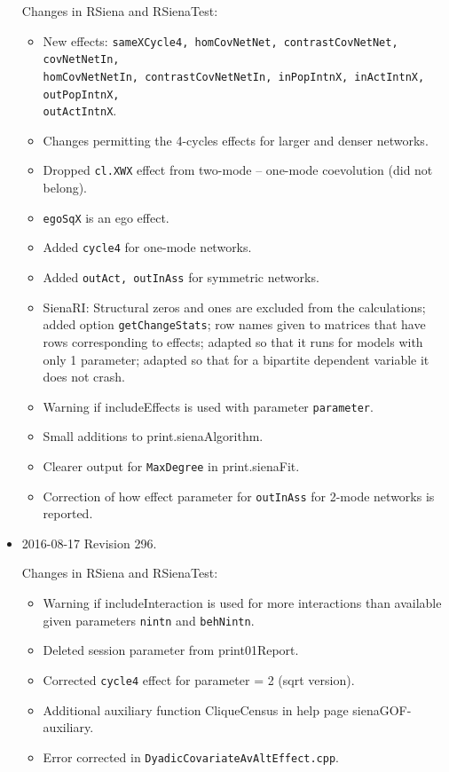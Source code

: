 \documentclass[a4paper,fleqn,11pt]{article}
\newcommand{\+}{\, + \,}
\newcommand{\sfn}[1]{\textsf{#1}}
\begin{document}
\begin{small}
\begin{itemize}
Changes in \textsf{RSiena} and \textsf{RSienaTest}:
\begin{itemize}
   \item New effects: \texttt{sameXCycle4, homCovNetNet, contrastCovNetNet,
     covNetNetIn, \\
     homCovNetNetIn, contrastCovNetNetIn, inPopIntnX, inActIntnX, outPopIntnX, \\
     outActIntnX}.
   \item Changes permitting the 4-cycles effects for larger and denser networks.
   \item Dropped \texttt{cl.XWX} effect from two-mode -- one-mode coevolution
     (did not belong).
   \item \texttt{egoSqX} is an ego effect.
   \item Added \texttt{cycle4} for one-mode networks.
   \item Added \texttt{outAct, outInAss} for symmetric networks.
   \item \sfn{SienaRI}: Structural zeros and ones are excluded from the calculations;
     added option \texttt{getChangeStats};
     row names given to matrices that have rows corresponding to effects;
     adapted so that it runs for models with only 1 parameter;
     adapted so that for a bipartite dependent variable it does not crash.
   \item Warning if \sfn{includeEffects} is used with parameter \texttt{parameter}.
   \item Small additions to \sfn{print.sienaAlgorithm}.
   \item Clearer output for \texttt{MaxDegree} in \sfn{print.sienaFit}.
   \item Correction of how effect parameter for \texttt{outInAss}
     for 2-mode networks is reported.
\end{itemize}


\item 2016-08-17 Revision 296.

Changes in \textsf{RSiena} and \textsf{RSienaTest}:
\begin{itemize}
   \item Warning if \sfn{includeInteraction} is used for more interactions
     than available given parameters \texttt{nintn} and \texttt{behNintn}.
   \item Deleted session parameter from \textsf{print01Report}.
   \item Corrected \texttt{cycle4} effect for parameter = 2 (sqrt version).
   \item Additional auxiliary function \sfn{CliqueCensus} in help page \sfn{sienaGOF-auxiliary}.
   \item Error corrected in \texttt{DyadicCovariateAvAltEffect.cpp}.
\end{itemize}



\end{itemize}
\end{small}
\end{document}
